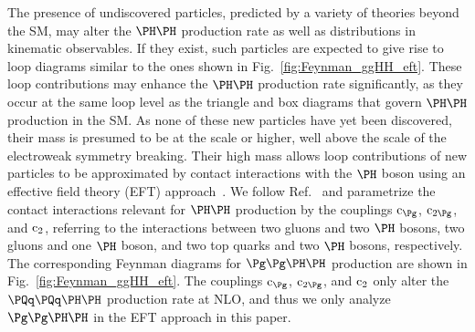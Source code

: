 The presence of undiscovered particles, predicted by a variety of theories beyond the SM, may alter the $\HH$ production rate
as well as distributions in kinematic observables.
If they exist, such particles are expected to give rise to loop diagrams similar to the ones shown in Fig.~\ref{fig:Feynman_ggHH_eft}.
These loop contributions may enhance the $\HH$ production rate significantly,
as they occur at the same loop level as the triangle and box diagrams that govern $\HH$ production in the SM.
As none of these new particles have yet been discovered, their mass is presumed to be at the \TeV scale or higher,
well above the scale of the electroweak symmetry breaking.
Their high mass allows loop contributions of new particles to be approximated by contact interactions with the $\PHiggs$ boson
using an effective field theory (EFT) approach~\cite{Buchmuller:1985jz,Grzadkowski:2010es}.
We follow Ref.~\cite{Carvalho:2015ttv} and parametrize the contact interactions relevant for $\HH$ production by the couplings $\cg$, $\cgg$, and $\text{c}_{2}$,
referring to the interactions between two gluons and two $\PHiggs$ bosons, two gluons and one $\PHiggs$ boson, 
and two top quarks and two $\PHiggs$ bosons, respectively.
The corresponding Feynman diagrams for $\ggHH$ production are shown in Fig.~\ref{fig:Feynman_ggHH_eft}.
The couplings $\cg$, $\cgg$, and $\text{c}_{2}$ only alter the $\qqHH$ production rate at NLO,
and thus we only analyze $\ggHH$ in the EFT approach in this paper.

